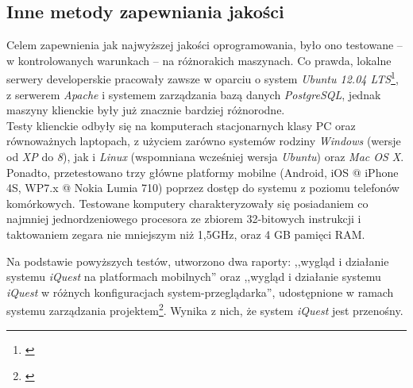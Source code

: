 \subsection{Inne metody zapewniania jakości}
\label{Chapter714}

Celem zapewnienia jak najwyższej jakości oprogramowania, było ono testowane -- w kontrolowanych warunkach -- na różnorakich maszynach. Co prawda, lokalne serwery developerskie pracowały zawsze w oparciu o system \textit{Ubuntu 12.04 LTS}\footnote{\cite{Man:Ubuntu}}, z serwerem \textit{Apache} i systemem zarządzania bazą danych \textit{PostgreSQL}, jednak maszyny klienckie były już znacznie bardziej różnorodne. \\

Testy klienckie odbyły się na komputerach stacjonarnych klasy PC oraz równoważnych laptopach, z użyciem zarówno systemów rodziny \textit{Windows} (wersje od \textit{XP} do \textit{8}), jak i \textit{Linux} (wspomniana wcześniej wersja \textit{Ubuntu}) oraz \textit{Mac OS X}. Ponadto, przetestowano trzy główne platformy mobilne (Android, iOS @ iPhone 4S, WP7.x @ Nokia Lumia 710) poprzez dostęp do systemu z poziomu telefonów komórkowych. Testowane komputery charakteryzowały się posiadaniem co najmniej jednordzeniowego procesora ze zbiorem 32-bitowych instrukcji i taktowaniem zegara nie mniejszym niż 1,5GHz, oraz 4 GB pamięci RAM.

Na podstawie powyższych testów, utworzono dwa raporty: ,,wygląd i działanie systemu \textit{iQuest} na platformach mobilnych'' oraz ,,wygląd i działanie systemu \textit{iQuest} w różnych konfiguracjach system-przeglądarka'', udostępnione w ramach systemu zarządzania projektem\footnote{\cite{Redmine:ProjDocs}}. Wynika z nich, że system \textit{iQuest} jest przenośny.